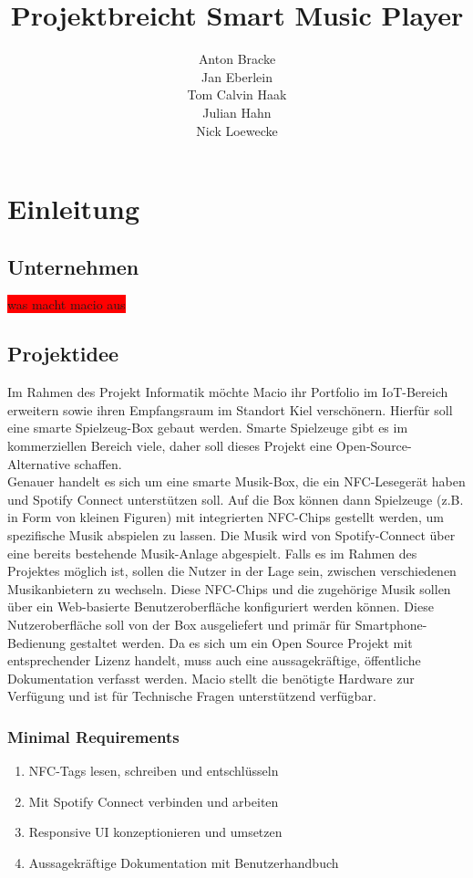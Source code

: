 \documentclass[10pt, a4paper, draft]{article}
\title{Projektbreicht Smart Music Player}
\author{Anton Bracke\\Jan Eberlein\\Tom Calvin Haak\\Julian Hahn\\Nick Loewecke}
\begin{document}
\maketitle
\tableofcontents

\section{Einleitung}
\subsection{Unternehmen}
\colorbox{red}{was macht macio aus}
\subsection{Projektidee}
Im Rahmen des Projekt Informatik möchte Macio ihr Portfolio im IoT-Bereich erweitern sowie ihren Empfangsraum im Standort Kiel verschönern.
Hierfür soll eine smarte Spielzeug-Box gebaut werden.
Smarte Spielzeuge gibt es im kommerziellen Bereich viele, daher soll dieses Projekt eine Open-Source-Alternative schaffen.\\
Genauer handelt es sich um eine smarte Musik-Box, die ein NFC-Lesegerät haben und Spotify Connect unterstützen soll.
Auf die Box können dann Spielzeuge (z.B. in Form von kleinen Figuren) mit integrierten NFC-Chips gestellt werden, um spezifische Musik abspielen zu lassen.
Die Musik wird von Spotify-Connect über eine bereits bestehende Musik-Anlage abgespielt.
Falls es im Rahmen des Projektes möglich ist, sollen die Nutzer in der Lage sein, zwischen verschiedenen Musikanbietern zu wechseln.
Diese NFC-Chips und die zugehörige Musik sollen über ein Web-basierte Benutzeroberfläche konfiguriert werden können.
Diese Nutzeroberfläche soll von der Box ausgeliefert und primär für Smartphone-Bedienung gestaltet werden.
Da es sich um ein Open Source Projekt mit entsprechender Lizenz handelt, muss auch eine aussagekräftige, öffentliche Dokumentation verfasst werden.
Macio stellt die benötigte Hardware zur Verfügung und ist für Technische Fragen unterstützend verfügbar.

\subsubsection{Minimal Requirements}
\begin{enumerate}
  \item NFC-Tags lesen, schreiben und entschlüsseln
  \item Mit Spotify Connect verbinden und arbeiten
  \item Responsive UI konzeptionieren und umsetzen
  \item Aussagekräftige Dokumentation mit Benutzerhandbuch
\end{enumerate}
\end{document}
